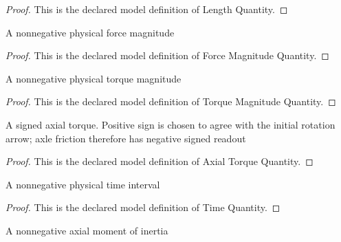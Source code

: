 \begin{proof}
  This is the declared model definition of Length Quantity.
\end{proof}
\begin{definition}
  \label{def:physics:phyx-mini-0781:phyxminiproblems-problemphyxmini0781-forcemagnitudequantity}
  A nonnegative physical force magnitude
\end{definition}
\begin{proof}
  This is the declared model definition of Force Magnitude Quantity.
\end{proof}
\begin{definition}
  \label{def:physics:phyx-mini-0781:phyxminiproblems-problemphyxmini0781-torquemagnitudequantity}
  A nonnegative physical torque magnitude
\end{definition}
\begin{proof}
  This is the declared model definition of Torque Magnitude Quantity.
\end{proof}
\begin{definition}
  \label{def:physics:phyx-mini-0781:phyxminiproblems-problemphyxmini0781-axialtorquequantity}
  A signed axial torque. Positive sign is chosen to agree with the initial rotation arrow; axle friction therefore has negative signed readout
\end{definition}
\begin{proof}
  This is the declared model definition of Axial Torque Quantity.
\end{proof}
\begin{definition}
  \label{def:physics:phyx-mini-0781:phyxminiproblems-problemphyxmini0781-timequantity}
  A nonnegative physical time interval
\end{definition}
\begin{proof}
  This is the declared model definition of Time Quantity.
\end{proof}
\begin{definition}
  \label{def:physics:phyx-mini-0781:phyxminiproblems-problemphyxmini0781-axialmomentofinertiaquantity}
  A nonnegative axial moment of inertia
\end{definition}
